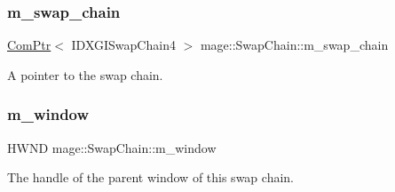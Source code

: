 \subsubsection{\texorpdfstring{m\+\_\+swap\+\_\+chain}{m\_swap\_chain}}
{\footnotesize\ttfamily \hyperlink{namespacemage_ae74f374780900893caa5555d1031fd79}{Com\+Ptr}$<$ I\+D\+X\+G\+I\+Swap\+Chain4 $>$ mage\+::\+Swap\+Chain\+::m\+\_\+swap\+\_\+chain\hspace{0.3cm}{\ttfamily [private]}}

A pointer to the swap chain. \hypertarget{classmage_1_1_swap_chain_a3eb5ca77874f177e48ac2b77a97cb382}{}\label{classmage_1_1_swap_chain_a3eb5ca77874f177e48ac2b77a97cb382} 
\subsubsection{\texorpdfstring{m\+\_\+window}{m\_window}}
{\footnotesize\ttfamily H\+W\+ND mage\+::\+Swap\+Chain\+::m\+\_\+window\hspace{0.3cm}{\ttfamily [private]}}

The handle of the parent window of this swap chain. 
